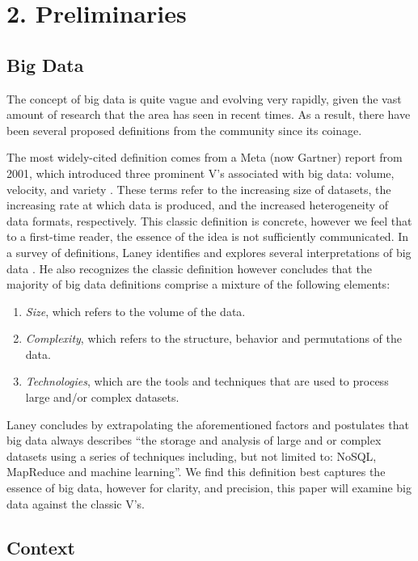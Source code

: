 \documentclass{sigchi}
\begin{document}
\section{2. Preliminaries}
\subsection{Big Data}

The concept of big data is quite vague and evolving very rapidly, given the vast amount of research that the area has seen in recent times. As a result, there have been several proposed definitions from the community since its coinage.

The most widely-cited definition comes from a Meta (now Gartner)  report from 2001, which introduced three prominent V's associated with big data: volume, velocity, and variety \cite{laney20013d}. These terms refer to the increasing size of datasets, the increasing rate at which data is produced, and the increased heterogeneity of data formats, respectively. This classic definition is concrete, however we feel that to a first-time reader, the essence of the idea is not sufficiently communicated. In a survey of definitions, Laney identifies and explores several interpretations of big data \cite{laney20013d}. He also recognizes the classic definition however concludes that the majority of big data definitions comprise a mixture of the following elements:

\begin{enumerate}
\item \textit{Size}, which refers to the volume of the data.
\item \textit{Complexity}, which refers to the structure, behavior and permutations of the data.
\item \textit{Technologies}, which are the tools and techniques that are used to process large and/or complex datasets.
\end{enumerate}

Laney concludes by extrapolating the aforementioned factors and postulates that big data always describes ``the storage and analysis of large and or complex datasets using a series of techniques including, but not limited to: NoSQL, MapReduce and machine learning''. We find this definition best captures the essence of big data, however for clarity, and precision, this paper will examine big data against the classic V's.

\subsection{Context}
\end{document}
